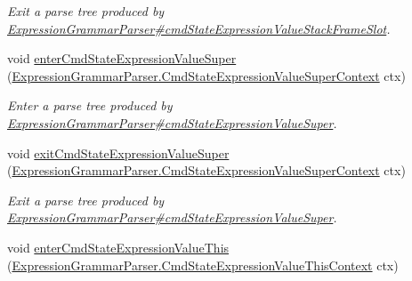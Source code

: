 \begin{DoxyCompactItemize}
\begin{DoxyCompactList}\small\item\em Exit a parse tree produced by \hyperlink{classgov_1_1nasa_1_1jpf_1_1inspector_1_1server_1_1expression_1_1parser_1_1_expression_grammar_parser_a6b064d2ec6f62d4260a820ef3c1864e9}{Expression\+Grammar\+Parser\#cmd\+State\+Expression\+Value\+Stack\+Frame\+Slot}. \end{DoxyCompactList}\item 
void \hyperlink{interfacegov_1_1nasa_1_1jpf_1_1inspector_1_1server_1_1expression_1_1parser_1_1_expression_grammar_listener_a4cab7d2fab11b6dbf77e29afe5d72d43}{enter\+Cmd\+State\+Expression\+Value\+Super} (\hyperlink{classgov_1_1nasa_1_1jpf_1_1inspector_1_1server_1_1expression_1_1parser_1_1_expression_grammar_pa66c003646cac4c60d53e10c6587465ef}{Expression\+Grammar\+Parser.\+Cmd\+State\+Expression\+Value\+Super\+Context} ctx)
\begin{DoxyCompactList}\small\item\em Enter a parse tree produced by \hyperlink{classgov_1_1nasa_1_1jpf_1_1inspector_1_1server_1_1expression_1_1parser_1_1_expression_grammar_parser_ae563e67295fa935ca387e0ff9ec0d599}{Expression\+Grammar\+Parser\#cmd\+State\+Expression\+Value\+Super}. \end{DoxyCompactList}\item 
void \hyperlink{interfacegov_1_1nasa_1_1jpf_1_1inspector_1_1server_1_1expression_1_1parser_1_1_expression_grammar_listener_a27d8ae8b0355d50057be1c5ddbe78d10}{exit\+Cmd\+State\+Expression\+Value\+Super} (\hyperlink{classgov_1_1nasa_1_1jpf_1_1inspector_1_1server_1_1expression_1_1parser_1_1_expression_grammar_pa66c003646cac4c60d53e10c6587465ef}{Expression\+Grammar\+Parser.\+Cmd\+State\+Expression\+Value\+Super\+Context} ctx)
\begin{DoxyCompactList}\small\item\em Exit a parse tree produced by \hyperlink{classgov_1_1nasa_1_1jpf_1_1inspector_1_1server_1_1expression_1_1parser_1_1_expression_grammar_parser_ae563e67295fa935ca387e0ff9ec0d599}{Expression\+Grammar\+Parser\#cmd\+State\+Expression\+Value\+Super}. \end{DoxyCompactList}\item 
void \hyperlink{interfacegov_1_1nasa_1_1jpf_1_1inspector_1_1server_1_1expression_1_1parser_1_1_expression_grammar_listener_af2ba7755882de8577b0b7afaa26f1a82}{enter\+Cmd\+State\+Expression\+Value\+This} (\hyperlink{classgov_1_1nasa_1_1jpf_1_1inspector_1_1server_1_1expression_1_1parser_1_1_expression_grammar_pa5c670e8752735864512a29116a6ade67}{Expression\+Grammar\+Parser.\+Cmd\+State\+Expression\+Value\+This\+Context} ctx)

\end{DoxyCompactItemize}
